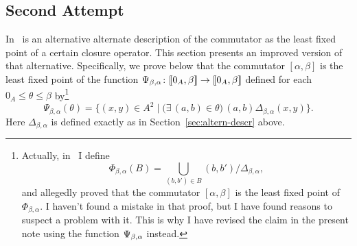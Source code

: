 \subsection{Second Attempt}
In~\cite{com-fix-poi} is an alternative alternate description of the commutator
as the least fixed point of a certain closure operator.
This section presents an improved version of that alternative.
Specifically, we prove below that the commutator $[\alpha, \beta]$ is the least fixed
point of the function
$\Psi_{\beta, \alpha} \colon \llbracket 0_A, \beta\rrbracket\to \llbracket 0_A, \beta\rrbracket$
defined for each $0_A \leq \theta \leq \beta$ by\footnote{Actually, in~\cite{com-fix-poi}
I define %
\begin{equation*}
  \Phi_{\beta, \alpha}(B) = \bigcup_{(b,b')\in B} (b,b')/\Delta_{\beta, \alpha},
\end{equation*}
and allegedly proved that the commutator $[\alpha, \beta]$ is the least fixed point
of $\Phi_{\beta, \alpha}$.  I haven't found a mistake in that proof, but I have found reasons to
suspect a problem with it.  This is why I have revised the claim in the present note
using the function $\Psi_{\beta, \alpha}$ instead.}
\begin{equation}
  \label{eq:7}
  \Psi_{\beta, \alpha}(\theta)
  = \{ (x,y) \in A^2 \mid
  \bigl(\exists\, (a,b) \in \theta\big)\,
 (a,b) \mathrel{\Delta_{\beta, \alpha}} (x,y)\}.
\end{equation}
Here $\Delta_{\beta, \alpha}$ is defined exactly as 
in Section~\ref{sec:altern-descr} above.

